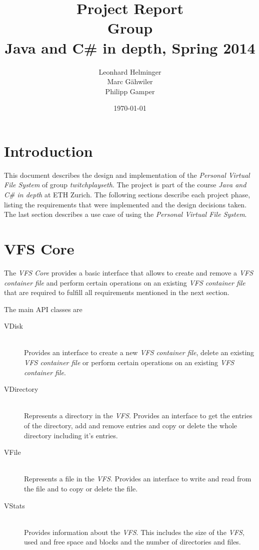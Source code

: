 \documentclass[a4paper,12pt]{article}
\title{
Project Report \\ 
Group \groupname \\
\vspace{5mm}
\large Java and C\# in depth, Spring 2014
}
\author{
Leonhard Helminger \\
Marc G\"ahwiler \\
Philipp Gamper
}
\date{\today}
\newcommand{\groupname}{twitchplayseth\xspace}
\begin{document}
\maketitle

\section{Introduction}

This document describes the design and implementation of the \emph{Personal Virtual File System} of group \emph{\groupname}. The project is part of the course \emph{Java and C\# in depth} at ETH Zurich. The following sections describe each project phase, listing the requirements that were implemented and the design decisions taken. The last section describes a use case of using the
\emph{Personal Virtual File System}.


\section{VFS Core}

The \emph{VFS Core} provides a basic interface that allows to create and remove a \emph{VFS container file} and perform certain operations on an existing \emph{VFS container file} that are required to fulfill all requirements mentioned in the next section.

The main API classes are 
\begin{description}

\item[VDisk] \hfill\\ Provides an interface to create a new \emph{VFS container file}, delete an existing \emph{VFS container file} or perform certain operations on an existing \emph{VFS container file}.

\item[VDirectory] \hfill\\ Represents a directory in the \emph{VFS}. Provides an interface to get the entries of the directory, add and remove entries and copy or delete the whole directory including it's entries.

\item[VFile] \hfill\\ Represents a file in the \emph{VFS}. Provides an interface to write and read from the file and to copy or delete the file.

\item[VStats] \hfill\\ Provides information about the \emph{VFS}. This includes the size of the \emph{VFS}, used and free space and blocks and the number of directories and files.
\end{description}
\end{document}
